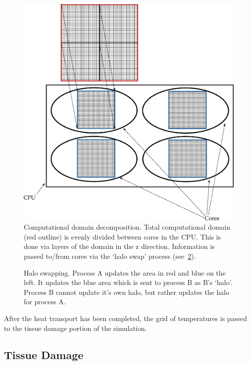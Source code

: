 \begin{figure}
\vspace{-45pt}
\centering
\includegraphics[scale=.35]{./ablation/images/grid-decomp.pdf}
\caption{Computational domain decomposition. Total computational domain (red outline) is evenly divided between cores in the CPU. This is done via layers of the domain in the z direction. Information is passed to/from cores via the `halo swap' process (see~\cref{fig:haloswap}).}
\label{fig:griddecomp}
\vspace{-10pt}
\end{figure}

\begin{figure}
\centering
\def\svgwidth{350pt}

\caption{Halo swapping. Process A updates the area in red and blue on the left. It updates the blue area which is sent to process B as B's `halo'. Process B cannot update it's own halo, but rather updates the halo for process A.}
\label{fig:haloswap}
\end{figure}


After the heat transport has been completed, the grid of temperatures is passed to the tissue damage portion of the simulation.

\subsection{Tissue Damage}%
\label{sec:tissuedamage}


